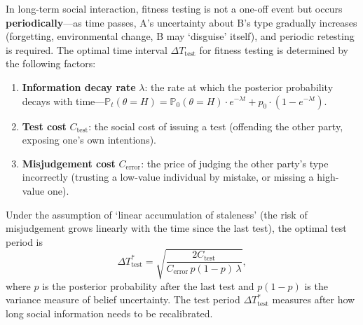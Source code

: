 \begin{proposition}\label{prop:shittest_periodic}
In long-term social interaction, fitness testing is not a one-off event but occurs \textbf{periodically}---as time passes, A's uncertainty about B's type gradually increases (forgetting, environmental change, B may `disguise' itself), and periodic retesting is required. The optimal time interval $\Delta T_{\text{test}}$ for fitness testing is determined by the following factors:
\begin{enumerate}[label=(\roman*)]
    \item \textbf{Information decay rate} $\lambda$: the rate at which the posterior probability decays with time---$\mathbb{P}_t(\theta = H) = \mathbb{P}_0(\theta = H) \cdot e^{-\lambda t} + p_0 \cdot (1 - e^{-\lambda t})$.
    \item \textbf{Test cost} $C_{\text{test}}$: the social cost of issuing a test (offending the other party, exposing one's own intentions).
    \item \textbf{Misjudgement cost} $C_{\text{error}}$: the price of judging the other party's type incorrectly (trusting a low-value individual by mistake, or missing a high-value one).
\end{enumerate}
Under the assumption of `linear accumulation of staleness' (the risk of misjudgement grows linearly with the time since the last test), the optimal test period is
\[
\Delta T_{\text{test}}^* = \sqrt{\frac{2 C_{\text{test}}}{C_{\text{error}}\, p(1-p)\, \lambda}},
\]
where $p$ is the posterior probability after the last test and $p(1-p)$ is the variance measure of belief uncertainty. The test period $\Delta T_{\text{test}}^*$ measures after how long social information needs to be recalibrated.
\end{proposition}

